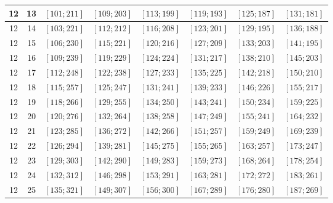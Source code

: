 \documentclass[a4paper,12pt]{article}
\begin{document}
\begin{center}
{\begin{longtable}[H]{|c|c|c|c|c|c|c|c|}
12 &  13 &  $\left[ 101; 211\right]$ &  $\left[ 109; 203\right]$ &  $\left[ 113; 199\right]$ &  $\left[ 119; 193\right]$ &  $\left[ 125; 187\right]$ &  $\left[ 131; 181\right]$ \tabularnewline \hline
12 &  14 &  $\left[ 103; 221\right]$ &  $\left[ 112; 212\right]$ &  $\left[ 116; 208\right]$ &  $\left[ 123; 201\right]$ &  $\left[ 129; 195\right]$ &  $\left[ 136; 188\right]$ \tabularnewline \hline
12 &  15 &  $\left[ 106; 230\right]$ &  $\left[ 115; 221\right]$ &  $\left[ 120; 216\right]$ &  $\left[ 127; 209\right]$ &  $\left[ 133; 203\right]$ &  $\left[ 141; 195\right]$ \tabularnewline \hline
12 &  16 &  $\left[ 109; 239\right]$ &  $\left[ 119; 229\right]$ &  $\left[ 124; 224\right]$ &  $\left[ 131; 217\right]$ &  $\left[ 138; 210\right]$ &  $\left[ 145; 203\right]$ \tabularnewline \hline
12 &  17 &  $\left[ 112; 248\right]$ &  $\left[ 122; 238\right]$ &  $\left[ 127; 233\right]$ &  $\left[ 135; 225\right]$ &  $\left[ 142; 218\right]$ &  $\left[ 150; 210\right]$ \tabularnewline \hline
12 &  18 &  $\left[ 115; 257\right]$ &  $\left[ 125; 247\right]$ &  $\left[ 131; 241\right]$ &  $\left[ 139; 233\right]$ &  $\left[ 146; 226\right]$ &  $\left[ 155; 217\right]$ \tabularnewline \hline
12 &  19 &  $\left[ 118; 266\right]$ &  $\left[ 129; 255\right]$ &  $\left[ 134; 250\right]$ &  $\left[ 143; 241\right]$ &  $\left[ 150; 234\right]$ &  $\left[ 159; 225\right]$ \tabularnewline \hline
12 &  20 &  $\left[ 120; 276\right]$ &  $\left[ 132; 264\right]$ &  $\left[ 138; 258\right]$ &  $\left[ 147; 249\right]$ &  $\left[ 155; 241\right]$ &  $\left[ 164; 232\right]$ \tabularnewline \hline
12 &  21 &  $\left[ 123; 285\right]$ &  $\left[ 136; 272\right]$ &  $\left[ 142; 266\right]$ &  $\left[ 151; 257\right]$ &  $\left[ 159; 249\right]$ &  $\left[ 169; 239\right]$ \tabularnewline \hline
12 &  22 &  $\left[ 126; 294\right]$ &  $\left[ 139; 281\right]$ &  $\left[ 145; 275\right]$ &  $\left[ 155; 265\right]$ &  $\left[ 163; 257\right]$ &  $\left[ 173; 247\right]$ \tabularnewline \hline
12 &  23 &  $\left[ 129; 303\right]$ &  $\left[ 142; 290\right]$ &  $\left[ 149; 283\right]$ &  $\left[ 159; 273\right]$ &  $\left[ 168; 264\right]$ &  $\left[ 178; 254\right]$ \tabularnewline \hline
12 &  24 &  $\left[ 132; 312\right]$ &  $\left[ 146; 298\right]$ &  $\left[ 153; 291\right]$ &  $\left[ 163; 281\right]$ &  $\left[ 172; 272\right]$ &  $\left[ 183; 261\right]$ \tabularnewline \hline
12 &  25 &  $\left[ 135; 321\right]$ &  $\left[ 149; 307\right]$ &  $\left[ 156; 300\right]$ &  $\left[ 167; 289\right]$ &  $\left[ 176; 280\right]$ &  $\left[ 187; 269\right]$ \tabularnewline \hline

\end{longtable}}
\end{center}
\end{document}
